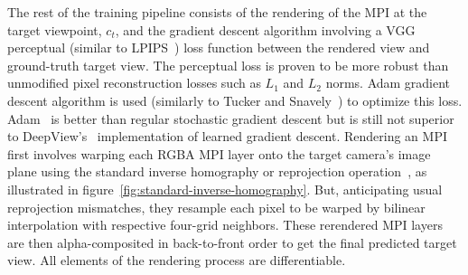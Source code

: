 The rest of the training pipeline consists of the rendering of the MPI at the target viewpoint, $c_t$, and the gradient descent algorithm involving a VGG perceptual (similar to LPIPS~\cite{zhang_unreasonable_2018}) loss function between the rendered view and ground-truth target view. The perceptual loss is proven to be more robust than unmodified pixel reconstruction losses such as $L_1$ and $L_2$ norms. Adam gradient descent algorithm is used (similarly to Tucker and Snavely~\cite{single_view_mpi}) to optimize this loss. Adam~\cite{kingma_adam_2017} is better than regular stochastic gradient descent but is still not superior to DeepView's~\cite{flynn_deepview_2019} implementation of learned gradient descent. Rendering an MPI first involves warping each RGBA MPI layer onto the target camera's image plane using the standard inverse homography or reprojection operation~\cite{hartley_multiple_2004}, as illustrated in figure~\ref{fig:standard-inverse-homography}. But, anticipating usual reprojection mismatches, they resample each pixel to be warped by bilinear interpolation with respective four-grid neighbors. These rerendered MPI layers are then alpha-composited in back-to-front order to get the final predicted target view. All elements of the rendering process are differentiable.

